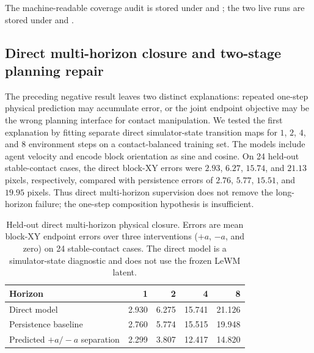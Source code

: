 \documentclass{article}
\begin{document}
The machine-readable coverage audit is stored under
 and
; the two
live runs are stored under
 and
.

\subsection{Direct multi-horizon closure and two-stage planning repair}
\label{sec:supp-two-stage-planning-repair}

The preceding negative result leaves two distinct explanations: repeated
one-step physical prediction may accumulate error, or the joint endpoint
objective may be the wrong planning interface for contact manipulation.  We
tested the first explanation by fitting separate direct simulator-state
transition maps for $1$, $2$, $4$, and $8$ environment steps on a
contact-balanced training set.  The models include agent velocity and encode
block orientation as sine and cosine.  On 24 held-out stable-contact cases,
the direct block-XY errors were $2.93$, $6.27$, $15.74$, and $21.13$ pixels,
respectively, compared with persistence errors of $2.76$, $5.77$, $15.51$,
and $19.95$ pixels.  Thus direct multi-horizon supervision does not remove
the long-horizon failure; the one-step composition hypothesis is insufficient.

\begin{table}[H]
\centering
\scriptsize
\setlength{\tabcolsep}{4pt}
\caption{Held-out direct multi-horizon physical closure. Errors are mean
block-XY endpoint errors over three interventions ($+a$, $-a$, and zero) on
24 stable-contact cases. The direct model is a simulator-state diagnostic and
does not use the frozen LeWM latent.}
\label{tab:supp-direct-multihorizon-closure}
\begin{tabular}{lrrrr}
\toprule
Horizon & 1 & 2 & 4 & 8 \\
\midrule
Direct model & 2.930 & 6.275 & 15.741 & 21.126 \\
Persistence baseline & 2.760 & 5.774 & 15.515 & 19.948 \\
Predicted $+a/-a$ separation & 2.299 & 3.807 & 12.417 & 14.820 \\
\bottomrule
\end{tabular}
\end{table}
\end{document}
